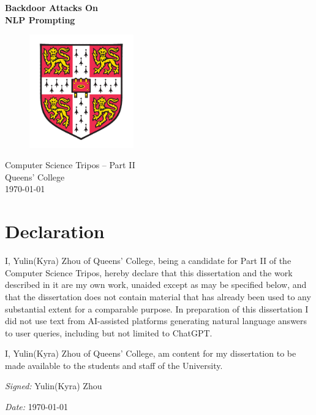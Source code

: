 \documentclass[12pt,a4paper,twoside,openright]{report}
\begin{document}
\pagestyle{empty}


\vspace*{60mm}
\begin{center}
	\Huge
	\textbf{Backdoor Attacks On \\ NLP Prompting} \\[3mm]
	\begin{figure}[!h]
        \centering
    \includegraphics[width=0.4\textwidth]{figures/university_shield.png}
\end{figure}
    \huge
	Computer Science Tripos -- Part II \\[4mm]
    Queens' College \\[4mm]
	\today \\ [4mm]
\end{center}


\thispagestyle{empty}


\pagestyle{plain}

\setcounter{page}{1}
\newpage
\section*{Declaration}

 {
  \setlength{\parskip}{\bigskipamount}

  I, Yulin(Kyra) Zhou of Queens' College, being a candidate for Part II of the Computer Science Tripos, hereby declare that this dissertation and the work described in it are my own work, unaided except as may be specified below, and that the dissertation does not contain material that has already been used to any substantial extent for a comparable purpose. In preparation of this dissertation I did not use text from AI-assisted platforms generating natural language answers to user queries, including but not limited to ChatGPT.

  I, Yulin(Kyra) Zhou of Queens' College, am content for my dissertation to be
  made available to the students and staff of the University.

  \emph{Signed:} Yulin(Kyra) Zhou

  \setlength{\parskip}{\smallskipamount}

  \emph{Date:} \today
 }
\end{document}
